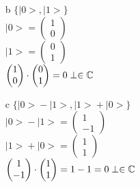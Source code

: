 \documentclass[11 pt]{article}
\theoremstyle{definition}
\theoremstyle{definition}
\def\ket#1{\big|{#1}\big>}
\begin{document}
\begin{enumerate}
\begin{enumerate}
\item[b] $\{\ket{0},\ket{1}\}$\\
\hspace*{1cm} $\ket{0} = \left( \begin{matrix}
1\\0
\end{matrix}\right)$\\
\hspace*{1cm} $\ket{1} = \left( \begin{matrix}
0\\1
\end{matrix}\right)$\\
\hspace*{1.2cm} $\left( \begin{matrix}
1\\0
\end{matrix}\right)\cdot\left( \begin{matrix}
0\\1
\end{matrix}\right) = 0\\
\perp\in\mathbb{C}$\\

\item[c] $\{\ket{0} - \ket{1},\ket{1} + \ket{0}\}$\\
\hspace*{1cm} $\ket{0} - \ket{1} = \left( \begin{matrix}
1\\-1
\end{matrix}\right)$\\
\hspace*{1cm} $\ket{1} + \ket{0} = \left( \begin{matrix}
1\\1
\end{matrix}\right)$\\
\hspace*{1.2cm}$\left( \begin{matrix}
1\\-1
\end{matrix}\right)\cdot\left( \begin{matrix}
1\\1
\end{matrix}\right) = 1 - 1 = 0\\
\perp\in\mathbb{C}$\\


\end{enumerate}
\end{enumerate}
\end{document}
